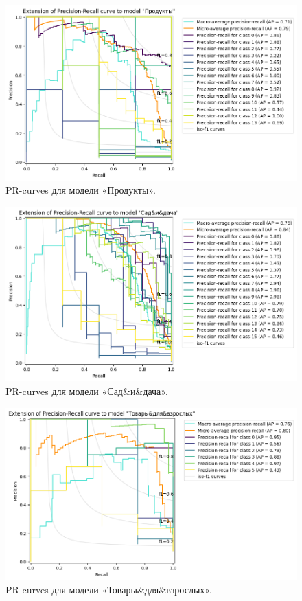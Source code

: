 \documentclass[a4paper,12pt]{extarticle}
\begin{document}
\begin{figure}[hbtp]
	\centering
	\includegraphics[scale=0.7]{pr_curves/prcurve_Продукты.png}
	\caption{PR-curves для модели «Продукты».}
	\label{fig:prcurve_Продукты}
\end{figure}

\begin{figure}[hbtp]
	\centering
	\includegraphics[scale=0.7]{pr_curves/prcurve_Сад&и&дача.png}
	\caption{PR-curves для модели «Сад\&и\&дача».}
	\label{fig:prcurve_Сад&и&дача}
\end{figure}

\begin{figure}[hbtp]
	\centering
	\includegraphics[scale=0.7]{pr_curves/prcurve_Товары&для&взрослых.png}
	\caption{PR-curves для модели «Товары\&для\&взрослых».}
	\label{fig:prcurve_Товары&для&взрослых}
\end{figure}
\end{document}
